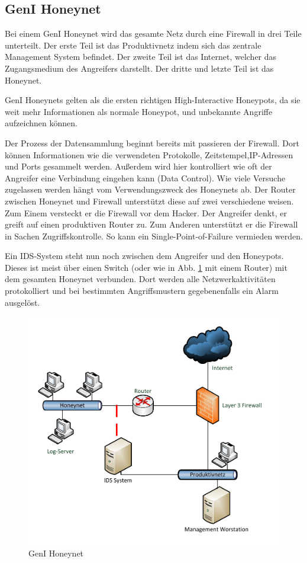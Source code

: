 \subsection{GenI Honeynet}
Bei einem GenI Honeynet wird das gesamte Netz durch eine Firewall in drei Teile unterteilt. Der erste Teil ist das Produktivnetz indem sich das zentrale Management System befindet. Der zweite Teil ist das Internet, welcher das Zugangsmedium des Angreifers darstellt. Der dritte und letzte Teil ist das Honeynet\cite{WebGenI.2006b}. 

GenI Honeynets gelten als die ersten richtigen High-Interactive Honeypots, da sie weit mehr Informationen als normale Honeypot, und unbekannte Angriffe aufzeichnen können\cite{spitzner.2002a}.

Der Prozess der Datensammlung beginnt bereits mit passieren der Firewall. Dort können Informationen wie die verwendeten Protokolle, Zeitstempel,IP-Adressen und Ports gesammelt werden. Außerdem wird hier kontrolliert wie oft der Angreifer eine Verbindung eingehen kann (Data Control). Wie viele Versuche zugelassen werden hängt vom Verwendungszweck des Honeynets ab. Der Router zwischen Honeynet und Firewall unterstützt diese auf zwei verschiedene weisen. Zum Einem versteckt er die Firewall vor dem Hacker. Der Angreifer denkt, er greift auf einen produktiven Router zu. Zum Anderen unterstützt er die Firewall in Sachen Zugriffskontrolle. So kann ein Single-Point-of-Failure vermieden werden\cite{grimes.2003a}\cite{WebGenI.2006b}. 

Ein \acf{IDS}-System steht nun noch zwischen dem Angreifer und den Honeypots. Dieses ist meist über einen Switch (oder wie in Abb. \ref{hnet:geni} mit einem Router) mit dem gesamten Honeynet verbunden. Dort werden alle Netzwerkaktivitäten protokolliert und bei bestimmten Angriffsmustern gegebenenfalls ein Alarm ausgelöst\cite{spitzner.2002a}. 

\begin{figure}[ht]
    \centering\includegraphics[scale=0.5]{Bilder/GenI.pdf}
  \caption{GenI Honeynet}
  \label{hnet:geni}
\end{figure}

